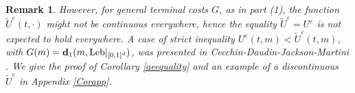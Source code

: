 \documentclass[reqno,11pt]{amsart}
\newtheorem{remark}[theorem]{Remark}
\numberwithin{equation}{section}
\newcommand{\yh}[1]{{\color{orange}[YH: #1]}}
\newcommand{\zd}[1]{{\color{brown}[ZD:#1]}}
\newcommand{\e}{\varepsilon}
\begin{document}
\begin{remark}


        However, for general terminal costs $G$, as in part (1), the function $\widetilde{U}^\e(t,\cdot)$ might not be continuous everywhere, hence the equality $\widetilde{U}^\e=U^\e$ is not expected to hold everywhere.
        A case of strict inequality $U^\e(t,m)<\widetilde{U}^\e(t,m)$, with $G(m)={\bf d}_1(m, \text{Leb}|_{[0,1]^d})$, was presented in Cecchin-Daudin-Jackson-Martini \cite[Corollary 6.10]{CecchinDaudinJacksonMartini2025}. We give the proof of Corollary \ref{aeequality} and an example of a discontinuous $\widetilde{U}^\e$ in Appendix \ref{Corapp}.
    \end{remark}




\end{document}

